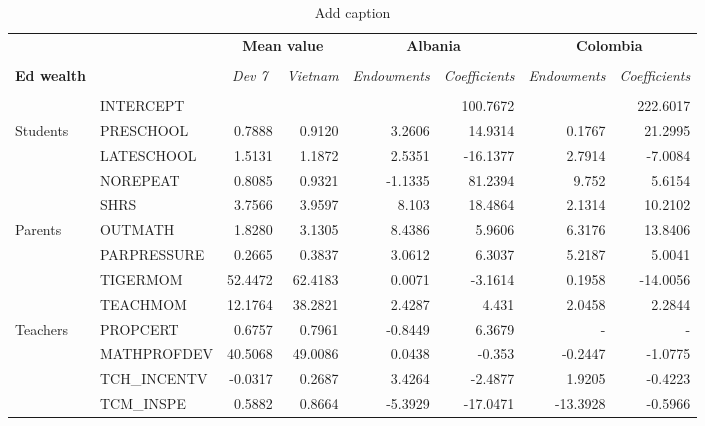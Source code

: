 \documentclass[10pt]{article}
\begin{document}
	
	\begin{table}[htbp]
		\footnotesize
		\def\arraystretch{1}
		\def\tabcolsep{4}
  \centering
  \caption{Add caption}
    \begin{tabular}{llrrrrrr}
    \toprule
    \midrule
          &       & \multicolumn{2}{c}{\textbf{Mean value}} & \multicolumn{2}{c}{\textbf{Albania}} & \multicolumn{2}{c}{\textbf{Colombia}} \\ 
          \cline{3-8} \\
    \textbf{Ed wealth} &       & \multicolumn{1}{c}{\textit{Dev 7 }} & \multicolumn{1}{c}{\textit{Vietnam}} & \multicolumn{1}{c}{\textit{Endowments}} & \multicolumn{1}{c}{\textit{Coefficients}} & \multicolumn{1}{c}{\textit{Endowments}} & \multicolumn{1}{c}{\textit{Coefficients}} \\[0.4em]
    \cline{3-8} \\
    \textbf{} & INTERCEPT & \multicolumn{1}{c}{\textit{}} & \multicolumn{1}{c}{\textit{}} & \multicolumn{1}{c}{\textit{}} & 100.7672 & \multicolumn{1}{c}{\textit{}} & 222.6017 \\[0.4em]
    Students & PRESCHOOL & 0.7888 & 0.9120 & 3.2606 & 14.9314 & 0.1767 & 21.2995 \\[0.4em]
          & LATESCHOOL & 1.5131 & 1.1872 & 2.5351 & -16.1377 & 2.7914 & -7.0084 \\[0.4em]
          & NOREPEAT & 0.8085 & 0.9321 & -1.1335 & 81.2394 & 9.752 & 5.6154 \\[0.4em]
          & SHRS  & 3.7566 & 3.9597 & 8.103 & 18.4864 & 2.1314 & 10.2102 \\[0.4em]
    Parents & OUTMATH & 1.8280 & 3.1305 & 8.4386 & 5.9606 & 6.3176 & 13.8406 \\[0.4em]
          & PARPRESSURE  & 0.2665 & 0.3837 & 3.0612 & 6.3037 & 5.2187 & 5.0041 \\[0.4em]
          & TIGERMOM & 52.4472 & 62.4183 & 0.0071 & -3.1614 & 0.1958 & -14.0056 \\[0.4em]
          & TEACHMOM & 12.1764 & 38.2821 & 2.4287 & 4.431 & 2.0458 & 2.2844 \\[0.4em]
    Teachers & PROPCERT & 0.6757 & 0.7961 & -0.8449 & 6.3679 & -     & - \\[0.4em]
          & MATHPROFDEV & 40.5068 & 49.0086 & 0.0438 & -0.353 & -0.2447 & -1.0775 \\[0.4em]
          & TCH\_INCENTV & -0.0317 & 0.2687 & 3.4264 & -2.4877 & 1.9205 & -0.4223 \\[0.4em]
          & TCM\_INSPE & 0.5882 & 0.8664 & -5.3929 & -17.0471 & -13.3928 & -0.5966 \\[0.4em]

\end{tabular}
\end{table}
\end{document}
